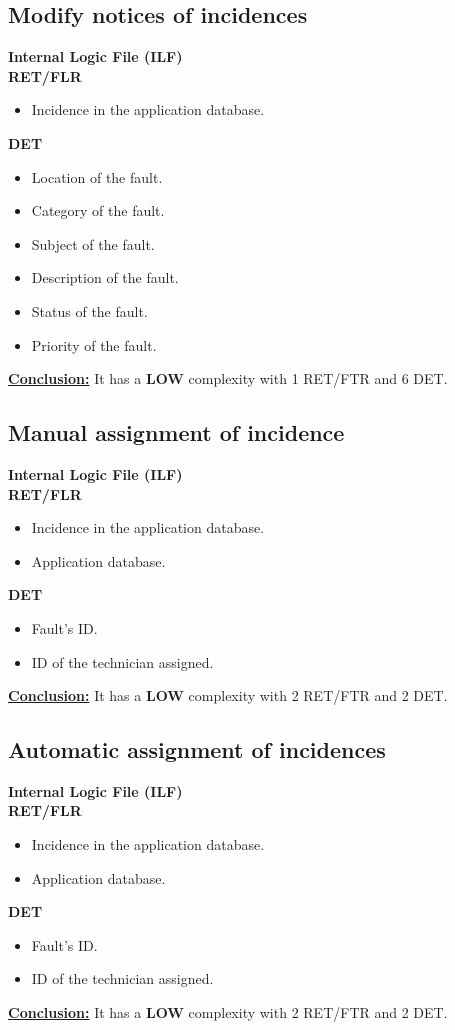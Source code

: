 \subsection{Modify notices of incidences}
\textbf{Internal Logic File (ILF)} \\ 
\textbf{RET/FLR}
\begin{itemize}
\item Incidence in the application database.
\end{itemize}
\textbf{DET}
\begin{itemize}
\item Location of the fault.
\item Category of the fault.
\item Subject of the fault.
\item Description of the fault.
\item Status of the fault.
\item Priority of the fault.
\end{itemize}
\textbf{\underline{Conclusion:}} It has a \textbf{LOW} complexity with 1 RET/FTR and 6 DET.

\subsection{Manual assignment of incidence}
\textbf{Internal Logic File (ILF)} \\ 
\textbf{RET/FLR}
\begin{itemize}
\item Incidence in the application database.
\item Application database.
\end{itemize}
\textbf{DET}
\begin{itemize}
\item Fault's ID.
\item ID of the technician assigned.
\end{itemize}
\textbf{\underline{Conclusion:}} It has a \textbf{LOW} complexity with 2 RET/FTR and 2 DET.

\subsection{Automatic assignment of incidences}
\textbf{Internal Logic File (ILF)} \\ 
\textbf{RET/FLR}
\begin{itemize}
\item Incidence in the application database.
\item Application database.
\end{itemize}
\textbf{DET}
\begin{itemize}
\item Fault's ID.
\item ID of the technician assigned.
\end{itemize}
\textbf{\underline{Conclusion:}} It has a \textbf{LOW} complexity with 2 RET/FTR and 2 DET.


